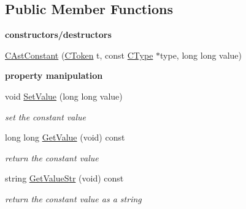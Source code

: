 \subsection*{Public Member Functions}
\begin{Indent}{\bf constructors/destructors}\par
\begin{DoxyCompactItemize}
\item 
\hyperlink{classCAstConstant_a2081884093b5bd820982c739dda4303c}{C\-Ast\-Constant} (\hyperlink{classCToken}{C\-Token} t, const \hyperlink{classCType}{C\-Type} $\ast$type, long long value)
\end{DoxyCompactItemize}
\end{Indent}
\begin{Indent}{\bf property manipulation}\par
\begin{DoxyCompactItemize}
\item 
\hypertarget{classCAstConstant_a4e31e7cc487f6ae5c3447445937108ea}{void \hyperlink{classCAstConstant_a4e31e7cc487f6ae5c3447445937108ea}{Set\-Value} (long long value)}\label{classCAstConstant_a4e31e7cc487f6ae5c3447445937108ea}

\begin{DoxyCompactList}\small\item\em set the constant value \end{DoxyCompactList}\item 
\hypertarget{classCAstConstant_aec8971df7fd13748ceff264e8e4cefb9}{long long \hyperlink{classCAstConstant_aec8971df7fd13748ceff264e8e4cefb9}{Get\-Value} (void) const }\label{classCAstConstant_aec8971df7fd13748ceff264e8e4cefb9}

\begin{DoxyCompactList}\small\item\em return the constant value \end{DoxyCompactList}\item 
\hypertarget{classCAstConstant_adba21ccc36e886124284fea68a835a25}{string \hyperlink{classCAstConstant_adba21ccc36e886124284fea68a835a25}{Get\-Value\-Str} (void) const }\label{classCAstConstant_adba21ccc36e886124284fea68a835a25}

\begin{DoxyCompactList}\small\item\em return the constant value as a string \end{DoxyCompactList}\end{DoxyCompactItemize}
\end{Indent}
